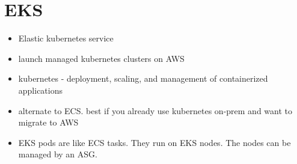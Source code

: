 \documentclass[]{scrartcl}
\begin{document}
\section{EKS}
\begin{itemize}
	\item Elastic kubernetes service
	\item launch managed kubernetes clusters on AWS
	\item kubernetes - deployment, scaling, and management of containerized applications
	\item alternate to ECS. best if you already use kubernetes on-prem and want to migrate to AWS
	\item EKS pods are like ECS tasks. They run on EKS nodes. The nodes can be managed by an ASG. 
\end{itemize}
\end{document}
